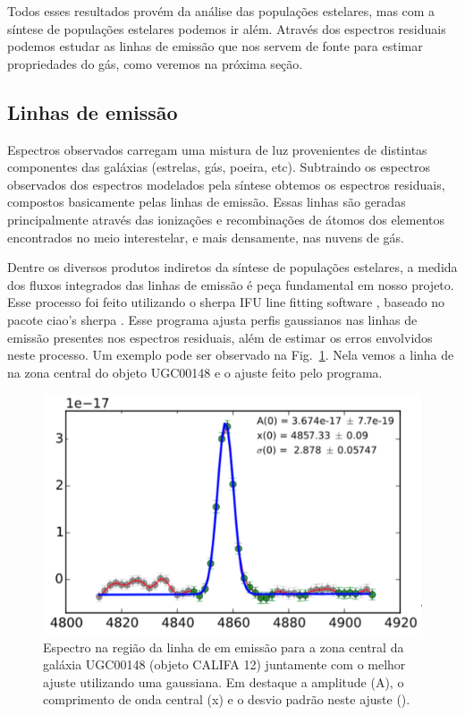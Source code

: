 Todos esses resultados provém da análise das populações estelares, mas com a síntese de populações estelares podemos ir além. Através dos espectros residuais podemos estudar as linhas de emissão que nos servem de fonte para estimar propriedades do gás, como veremos na próxima seção.

\subsection{Linhas de emissão}
\label{sec:intro:UFSCeIAA:EmLines}
Espectros observados carregam uma mistura de luz provenientes de distintas componentes das galáxias (estrelas, gás, poeira, etc). Subtraindo os espectros observados dos espectros modelados pela síntese obtemos os espectros residuais, compostos basicamente pelas linhas de emissão. Essas linhas são geradas principalmente através das ionizações e recombinações de átomos dos elementos encontrados no meio interestelar, e mais densamente, nas nuvens de gás.

Dentre os diversos produtos indiretos da síntese de populações estelares, a medida dos fluxos integrados das linhas de emissão é peça fundamental em nosso projeto. Esse processo foi feito utilizando o {\sc sherpa} IFU line fitting software \citep[SHIFU;][]{RGB.etal.2017}, baseado no pacote {\sc ciao's sherpa} \citep{Freeman.etal.2001, Doe.etal.2007}. Esse programa ajusta perfis gaussianos nas linhas de emissão presentes nos espectros residuais, além de estimar os erros envolvidos neste processo. Um exemplo pode ser observado na Fig.\ \ref{fig:rgbline}. Nela vemos a linha de \Hbeta na zona central do objeto UGC00148 e o ajuste feito pelo programa.

\begin{figure}
	\centering
	\includegraphics[scale=0.4]{figuras/K0012-zone0-Hb.pdf}
	\caption[Exemplo de ajuste de linha de emissão]
	{Espectro na região da linha de \Hbeta em emissão para a zona central da galáxia UGC00148 (objeto
CALIFA 12) juntamente com o melhor ajuste utilizando uma gaussiana. Em destaque a amplitude (A), o
comprimento de onda central (x) e o desvio padrão neste ajuste (\sigma).}
	\label{fig:rgbline}
\end{figure}



